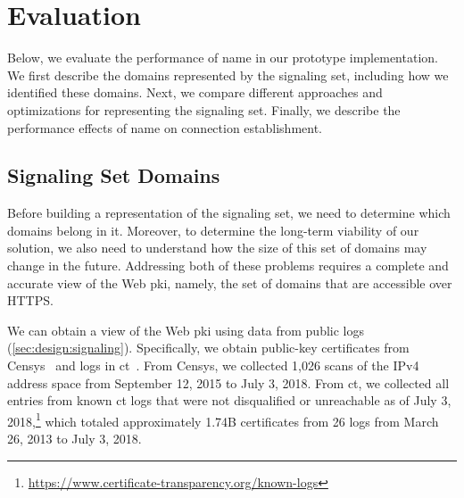\section{Evaluation}
\label{sec:evaluation}

Below, we evaluate the performance of \ac{name} in our prototype implementation.
We first describe the domains represented by the signaling set,
including how we identified these domains. Next, we compare different approaches
and optimizations for representing the signaling set. Finally, we describe the
performance effects of \ac{name} on connection establishment.

\subsection{Signaling Set Domains}
\label{sec:evaluation:https}

Before building a representation of the signaling set, we need to determine
which domains belong in it. Moreover, to determine the long-term
viability of our solution, we also need to understand how the size of this set
of domains may change in the future. Addressing both of these problems requires
a complete and accurate view of the Web \ac{pki}, namely, the set of domains
that are accessible over HTTPS.

We can obtain a view of the Web \ac{pki} using data from public logs (\autoref{sec:design:signaling}). 
Specifically, we obtain public-key
certificates from Censys~\cite{durumeric2015search} and logs in
\ac{ct}~\cite{rfc6962}. From Censys, we collected 1,026 scans of the IPv4
address space from September 12, 2015 to July 3, 2018.
From \ac{ct}, we collected all entries from known \ac{ct} logs that were not
disqualified or unreachable as of July 3,
2018,\footnote{\url{https://www.certificate-transparency.org/known-logs}} which
totaled approximately 1.74B certificates from 26 logs from
March 26, 2013 to July 3, 2018.


